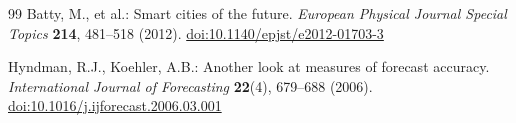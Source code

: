 \documentclass[runningheads,a4paper]{llncs}
\begin{document}
\begin{thebibliography}{99}
Batty, M., et al.: Smart cities of the future. \textit{European Physical Journal Special Topics} \textbf{214}, 481--518 (2012). \href{https://doi.org/10.1140/epjst/e2012-01703-3}{doi:10.1140/epjst/e2012-01703-3}

Hyndman, R.J., Koehler, A.B.: Another look at measures of forecast accuracy. \textit{International Journal of Forecasting} \textbf{22}(4), 679--688 (2006). \href{https://doi.org/10.1016/j.ijforecast.2006.03.001}{doi:10.1016/j.ijforecast.2006.03.001}

\end{thebibliography}
\end{document}
